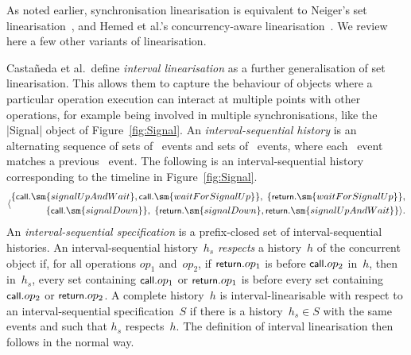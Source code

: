 As noted earlier, synchronisation linearisation is equivalent to Neiger's set
linearisation~\cite{Neiger-1994}, and Hemed et al.'s concurrency-aware
linearisation~\cite{HRV-2015}.  We review here a few other variants of
linearisation. 


Casta\~neda et al.\ define \emph{interval linearisation} \cite{CRR-2018,
  CRR-2023} as a further generalisation of set linearisation.  This allows
them to capture the behaviour of objects where a particular operation
execution can interact at multiple points with other operations, for example
being involved in multiple synchronisations, like the |Signal| object
of Figure~\ref{fig:Signal}.
%
An \emph{interval-sequential history} is an alternating
sequence of sets of \call\ events and sets of \return\ events, where each
\return\ event matches a previous \call\ event.   The following is an
interval-sequential history corresponding to the timeline in
Figure~\ref{fig:Signal}. 
\[
\seq{
\begin{align}
  \set{\call.\sm{signalUpAndWait}, \call.\sm{waitForSignalUp}},\;
  \set{\return.\sm{waitForSignalUp}}, \\
  \set{\call.\sm{signalDown}},\;
  \set{\return.\sm{signalDown}, \return.\sm{signalUpAndWait}}
}.
\end{align}
\]
An \emph{interval-sequential specification} is a prefix-closed set of
interval-sequential histories.  An interval-sequential history~$h_s$
\emph{respects} a history~$h$ of the concurrent object if, for all operations
$op_1$ and~$op_2$, if $\mbox{\sf{\small return}}.op_1$ is before $\mbox{\sf{\small call}}.op_2$ in~$h$, then
in~$h_s$, every set containing $\mbox{\sf{\small call}}.op_1$ or $\mbox{\sf{\small return}}.op_1$ is before every
set containing $\mbox{\sf{\small call}}.op_2$ or $\mbox{\sf{\small return}}.op_2$.  A complete history~$h$ is
interval-linearisable with respect to an interval-sequential specification~$S$
if there is a history~$h_s \in S$ with the same events and such that $h_s$
respects~$h$.  The definition of interval linearisation then follows in the
normal way.

%


